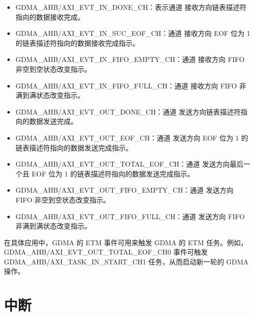 \documentclass[main\_\_CN.tex]{subfiles}
\begin{document}
\begin{itemize}
\item GDMA\_AHB/AXI\_EVT\_IN\_DONE\_CH：表示通道  接收方向链表描述符指向的数据接收完成。
\item GDMA\_AHB/AXI\_EVT\_IN\_SUC\_EOF\_CH：通道  接收方向 EOF 位为 1 的链表描述符指向的数据接收完成指示。
\item GDMA\_AHB/AXI\_EVT\_IN\_FIFO\_EMPTY\_CH：通道  接收方向 FIFO 非空到空状态改变指示。
\item GDMA\_AHB/AXI\_EVT\_IN\_FIFO\_FULL\_CH：通道  接收方向 FIFO 非满到满状态改变指示。
\item GDMA\_AHB/AXI\_EVT\_OUT\_DONE\_CH：通道  发送方向链表描述符指向的数据发送完成。
\item GDMA\_AHB/AXI\_EVT\_OUT\_EOF\_CH：通道  发送方向 EOF 位为 1 的链表描述符指向的数据发送完成指示。
\item GDMA\_AHB/AXI\_EVT\_OUT\_TOTAL\_EOF\_CH：通道  发送方向最后一个且 EOF 位为 1 的链表描述符指向的数据发送完成指示。
\item GDMA\_AHB/AXI\_EVT\_OUT\_FIFO\_EMPTY\_CH：通道  发送方向 FIFO 非空到空状态改变指示。
\item GDMA\_AHB/AXI\_EVT\_OUT\_FIFO\_FULL\_CH：通道  发送方向 FIFO 非满到满状态改变指示。
\end{itemize}

在具体应用中，GDMA 的 ETM 事件可用来触发 GDMA 的 ETM 任务。例如，GDMA\_AHB/AXI\_EVT\_OUT\_TOTAL\_EOF\_CH0 事件可触发 GDMA\_AHB/AXI\_TASK\_IN\_START\_CH1 任务，从而启动新一轮的 GDMA 操作。


\section{中断}
\end{document}
